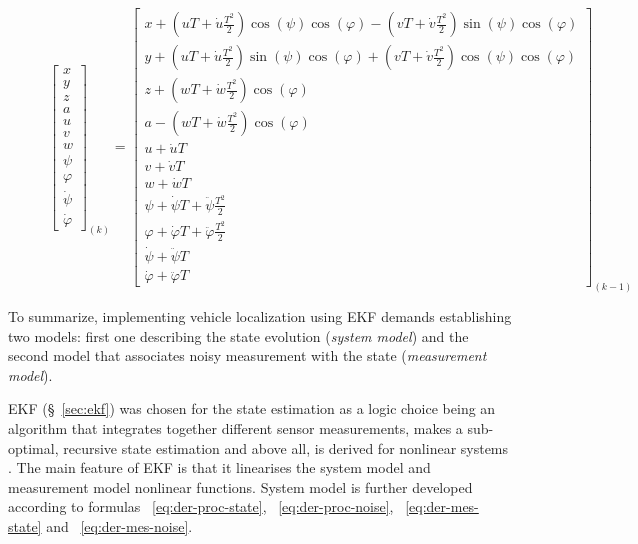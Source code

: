 \begin{figure}%
\vspace{-10pt}
\begin{equation}
\label{eq:state-tran-matrix}
\begin{bmatrix} x \\ y \\ z \\ a \\ u \\ v \\ w \\ \psi \\ \varphi \\ \dot{\psi} \\ \dot{\varphi} \end{bmatrix}_{(k)} =
\begin{bmatrix} x + (uT+\dot{u}\frac{T^{2}}{2})\cos(\psi)\cos(\varphi) - (vT+\dot{v}\frac{T^{2}}{2})\sin(\psi)\cos(\varphi) \\ 
                y + (uT+\dot{u}\frac{T^{2}}{2})\sin(\psi)\cos(\varphi) + (vT+\dot{v}\frac{T^{2}}{2})\cos(\psi)\cos(\varphi) \\ 
                z + (wT+\dot{w}\frac{T^{2}}{2})\cos(\varphi) \\ 
                a - (wT+\dot{w}\frac{T^{2}}{2})\cos(\varphi) \\ 
                u + \dot{u}T \\ 
                v + \dot{v}T \\ 
                w + \dot{w}T \\ 
                \psi    + \dot{\psi}T    + \ddot{\psi}   \frac{T^{2}}{2} \\ 
                \varphi + \dot{\varphi}T + \ddot{\varphi}\frac{T^{2}}{2} \\ 
                \dot{\psi}    + \ddot{\psi}T \\ 
                \dot{\varphi} + \ddot{\varphi}T
\end{bmatrix}_{(k-1)} 
\end{equation}
\vspace{-10pt}
\end{figure}
To summarize, implementing vehicle localization using EKF demands establishing two models: first one describing the state evolution (\textit{system model}) and the second model that associates noisy measurement with the state (\textit{measurement model}). 

EKF (\S~\ref{sec:ekf}) was chosen for the state estimation as a logic choice being an algorithm that integrates together different sensor measurements, makes a sub-optimal, recursive state estimation and above all, is derived for nonlinear systems \cite{thrun05}. The main feature of EKF is that it linearises the system model and measurement model nonlinear functions. System model is further developed according to formulas ~\ref{eq:der-proc-state}, ~\ref{eq:der-proc-noise}, ~\ref{eq:der-mes-state} and ~\ref{eq:der-mes-noise}.

